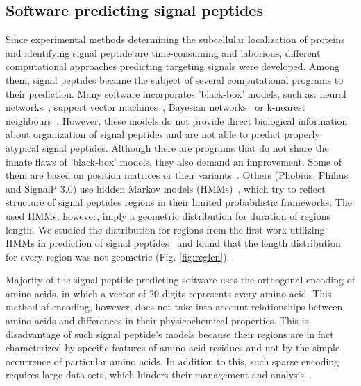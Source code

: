 \documentclass[10pt,letterpaper]{article}
\begin{document}
\subsection*{Software predicting signal peptides}

Since experimental methods determining the subcellular localization of proteins and identifying signal peptide are time-consuming and laborious, different computational approaches predicting targeting signals were developed. Among them, signal peptides became the subject of several computational programs to their prediction. Many software incorporates 'black-box’ models, such as: neural networks~\cite{2011petersensignalp}, support vector machines~\cite{2014zhangprediction}, Bayesian networks~\cite{2012zhengsignalbnf} or k-nearest neighbours~\cite{2007shensignall}. However, these models do not provide direct biological information about organization of signal peptides and are not able to predict properly atypical signal peptides. Although there are programs that do not share the innate flaws of 'black-box' models, they also demand an improvement. Some of them are based on position matrices or their variants~\cite{2014zhangprediction, 2004hillerpredisi}. Others (Phobius, Philius and SignalP 3.0) use hidden Markov models (HMMs)~\cite{2004klla, 2008reynoldstransmembrane, 2004bendtsenimproved}, which try to reflect structure of signal peptides regions in their limited probabilistic frameworks. The used HMMs, however, imply a geometric distribution for duration of regions length. We studied the distribution for regions from the first work utilizing HMMs in prediction of signal peptides~\cite{1998nielsenprediction} and found that the length distribution for every region was not geometric (Fig. \ref{fig:reglen}).

Majority of the signal peptide predicting software uses the orthogonal encoding of amino acids, in which a vector of 20 digits represents every amino acid. This method of encoding, however, does not take into account relationships between amino acids and differences in their physicochemical properties. This is disadvantage of such signal peptide's models because their regions are in fact characterized by specific features of amino acid residues and not by the simple occurrence of particular amino acids. In addition to this, such sparse encoding requires large data sets, which hinders their management and analysis~\cite{2002linamino}. 
\end{document}
